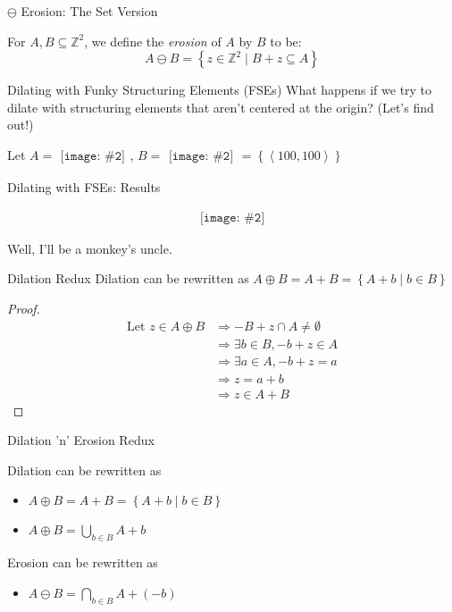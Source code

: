 \documentclass{beamer}
\newcommand{\pic}[2]{
     \begin{array}{l}
      \texttt{[image: \#2]}
      \end{array}
}
\newcommand{\set}[1]{\left\lbrace #1 \right\rbrace}
\newcommand{\buildset}[2]{\set{#1 \mid #2}}
\newcommand{\tuple}[1]{\left\langle #1 \right\rangle}
\newcommand{\intersect}{\cap}
\newcommand{\bigintersect}[1]{\displaystyle\bigcap_{#1}}
\newcommand{\bigunion}[1]{\displaystyle\bigcup_{#1}}
\newcommand{\integers}{\mathbb{Z}}
\newcommand{\imply}{\Rightarrow}
\newcommand{\dilate}{\oplus}
\newcommand{\erode}{\ominus}
\begin{document}
\begin{frame}{$\erode$ Erosion: The Set Version}
   \begin{definition}
    For $A,B \subseteq \integers^2$, we define the \emph{erosion} of 
    $A$ by $B$ to be:
    $$A \erode B=\buildset{z \in \mathbb{Z}^2}{B+z \subseteq A}$$
  \end{definition}
 
\end{frame}
\begin{frame}{Dilating with Funky Structuring Elements (FSEs)}
  What happens if we try to dilate with structuring elements that aren't
  centered at the origin? (Let's find out!)

  Let $A = \pic{width=50pt}{images/binarycoolhamblen.png}$,
      $B = \pic{width=50pt}{images/fse.png}=
           \set{\tuple{100,100}}$

\end{frame}

\begin{frame}{Dilating with FSEs: Results}

$$\pic{width=50pt}{./images/coolhamblen_translated.png}$$

Well, I'll be a monkey's uncle.

\end{frame}

\begin{frame}{Dilation Redux}
  Dilation can be rewritten as
  $A \dilate B = A + B = \buildset{A + b}{b \in B}$  
  \begin{proof}
    \begin{align*}
        \text{Let } z \in A \dilate B
      &\imply -B + z \intersect A \not= \emptyset
    \\&\imply \exists b \in B, -b + z \in A
    \\&\imply \exists a \in A, -b + z = a
    \\&\imply z = a+b
    \\&\imply z \in A+B
    \end{align*}
  \end{proof}
\end{frame}
\begin{frame}{Dilation 'n' Erosion Redux}

  Dilation can be rewritten as
  \begin{itemize}
    \item $A \dilate B = A + B = \buildset{A + b}{b \in B}$
    \item $A \dilate B = \bigunion{b \in B}A + b$
  \end{itemize}

  Erosion can be rewritten as
  \begin{itemize}
    \item $A \erode B = \bigintersect{b \in B}A + (-b)$
  \end{itemize}
  
\end{frame}
\end{document}
